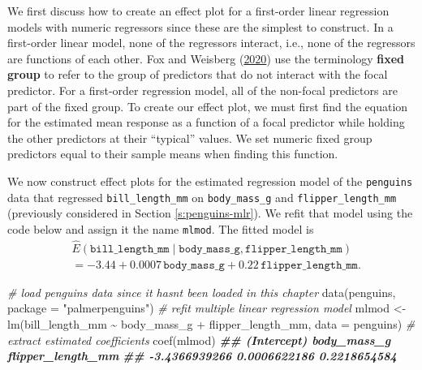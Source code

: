 \documentclass[
]{book}
\newenvironment{Shaded}{\begin{snugshade}}{\end{snugshade}}
\newcommand{\AttributeTok}[1]{\textcolor[rgb]{0.77,0.63,0.00}{#1}}
\newcommand{\CommentTok}[1]{\textcolor[rgb]{0.56,0.35,0.01}{\textit{#1}}}
\newcommand{\DocumentationTok}[1]{\textcolor[rgb]{0.56,0.35,0.01}{\textbf{\textit{#1}}}}
\newcommand{\FunctionTok}[1]{\textcolor[rgb]{0.00,0.00,0.00}{#1}}
\newcommand{\NormalTok}[1]{#1}
\newcommand{\OtherTok}[1]{\textcolor[rgb]{0.56,0.35,0.01}{#1}}
\newcommand{\SpecialCharTok}[1]{\textcolor[rgb]{0.00,0.00,0.00}{#1}}
\newcommand{\StringTok}[1]{\textcolor[rgb]{0.31,0.60,0.02}{#1}}
\theoremstyle{definition}
\theoremstyle{definition}
\theoremstyle{definition}
\theoremstyle{definition}
\theoremstyle{remark}
\begin{document}
We first discuss how to create an effect plot for a first-order linear
regression models with numeric regressors since these are the simplest
to construct. In a first-order linear model, none of the regressors
interact, i.e., none of the regressors are functions of each other.
Fox and Weisberg (\protect\hyperlink{ref-fox2020predictor}{2020}) use the terminology \textbf{fixed group} to refer to the
group of predictors that do not interact with the focal predictor. For a
first-order regression model, all of the non-focal predictors are part
of the fixed group. To create our effect plot, we must first find the
equation for the estimated mean response as a function of a focal
predictor while holding the other predictors at their ``typical'' values.
We set numeric fixed group predictors equal to their sample means when
finding this function.

We now construct effect plots for the estimated regression model of the
\texttt{penguins} data that regressed \texttt{bill\_length\_mm} on \texttt{body\_mass\_g} and
\texttt{flipper\_length\_mm} (previously considered in Section
\ref{s:penguins-mlr}). We refit that model using the code below and
assign it the name \texttt{mlmod}. The fitted model is \[
\begin{aligned}
&\hat{E}(\mathtt{bill\_length\_mm}\mid \mathtt{body\_mass\_g}, \mathtt{flipper\_length\_mm})\\
&=-3.44+0.0007 \,\mathtt{body\_mass\_g}+0.22\,\mathtt{flipper\_length\_mm}.
\end{aligned}
\label{eq:mlr-effect-equation}
\]

\begin{Shaded}
\begin{Highlighting}[]
\CommentTok{\# load penguins data since it hasn\textquotesingle{}t been loaded in this chapter}
\FunctionTok{data}\NormalTok{(penguins, }\AttributeTok{package =} \StringTok{"palmerpenguins"}\NormalTok{)}
\CommentTok{\# refit multiple linear regression model}
\NormalTok{mlmod }\OtherTok{\textless{}{-}} \FunctionTok{lm}\NormalTok{(bill\_length\_mm }\SpecialCharTok{\textasciitilde{}}\NormalTok{ body\_mass\_g }\SpecialCharTok{+}\NormalTok{ flipper\_length\_mm, }\AttributeTok{data =}\NormalTok{ penguins)}
\CommentTok{\# extract estimated coefficients}
\FunctionTok{coef}\NormalTok{(mlmod)}
\DocumentationTok{\#\#       (Intercept)       body\_mass\_g flipper\_length\_mm }
\DocumentationTok{\#\#     {-}3.4366939266      0.0006622186      0.2218654584}
\end{Highlighting}
\end{Shaded}
\end{document}
